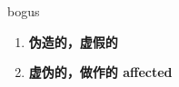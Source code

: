 
\begin{frame}
{\huge bogus}
\begin{center}
\begin{enumerate}\Large
  \item \textbf{伪造的，虚假的}
  \item \textbf{虚伪的，做作的 affected}
\end{enumerate}
\end{center}
\end{frame}
